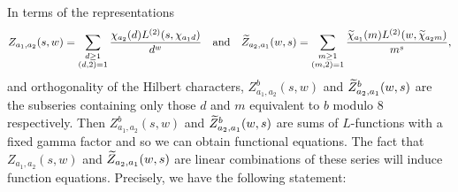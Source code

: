 \documentclass[12pt,reqno,oneside]{amsart}
\begin{document}
    In terms of the representations
    \[
        Z_{a_{1},a_{2}}(s,w) = \sum_{\substack{d \ge 1 \\ (d,2) = 1}}\frac{\chi_{a_{2}}(d)L^{(2)}(s,\chi_{a_{1}d})}{d^{w}} \quad \text{and} \quad \widetilde{Z}_{a_{2},a_{1}}(w,s) = \sum_{\substack{m \ge 1 \\ (m,2) = 1}}\frac{\widetilde{\chi}_{a_{1}}(m)L^{(2)}(w,\widetilde{\chi}_{a_{2}m})}{m^{s}},
    \]
    and orthogonality of the Hilbert characters, $Z_{a_{1},a_{2}}^{b}(s,w)$ and $\widetilde{Z}_{a_{2},a_{1}}^{b}(w,s)$ are the subseries containing only those $d$ and $m$ equivalent to $b$ modulo $8$ respectively. Then $Z_{a_{1},a_{2}}^{b}(s,w)$ and $\widetilde{Z}_{a_{2},a_{1}}^{b}(w,s)$ are sums of $L$-functions with a fixed gamma factor and so we can obtain functional equations. The fact that $Z_{a_{1},a_{2}}(s,w)$ and $\widetilde{Z}_{a_{2},a_{1}}(w,s)$ are linear combinations of these series will induce function equations. Precisely, we have the following statement:
\end{document}
